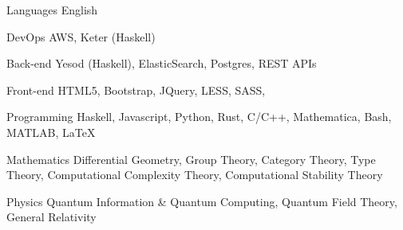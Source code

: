 

\begin{cvskills}


  \cvskill
    {Languages} %
    {English} %
  
  \cvskill
    {DevOps} %
    {AWS, Keter (Haskell)} %

  \cvskill
    {Back-end} %
    {Yesod (Haskell), ElasticSearch, Postgres, REST APIs} %

  \cvskill
    {Front-end} %
    {HTML5, Bootstrap, JQuery, LESS, SASS, } %

  \cvskill
    {Programming} %
    {Haskell, Javascript, Python, Rust, C/C++, Mathematica, Bash, MATLAB, \LaTeX} %

  \cvskill
  {Mathematics}
  {Differential Geometry, Group Theory, Category Theory, Type Theory,
    Computational Complexity Theory, Computational Stability Theory}

  \cvskill
  {Physics}
  {Quantum Information \& Quantum Computing, Quantum Field Theory, General Relativity}

\end{cvskills}

